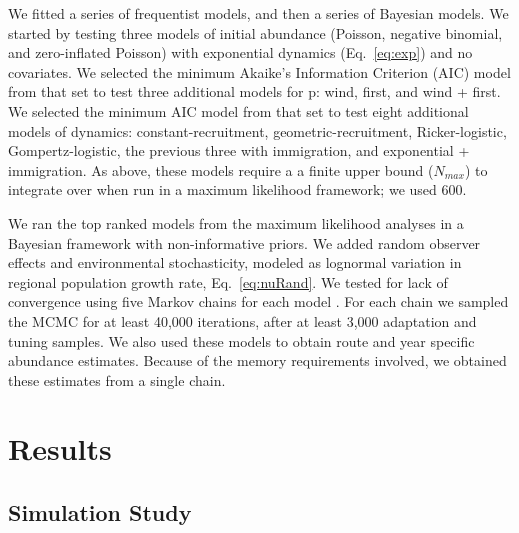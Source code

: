 \documentclass[12pt]{article}
\begin{document}
We fitted a series of frequentist models, 
and then a series of Bayesian models. We started by testing
three models of initial abundance (Poisson, negative binomial, and
zero-inflated Poisson) with exponential dynamics
(Eq.~\ref{eq:exp}) and no covariates.  We selected the minimum Akaike's Information
Criterion (AIC) model from that set to test three additional
models for p: wind, first, and wind + first. We selected the minimum
AIC model from that set to test eight additional models of dynamics:
constant-recruitment, geometric-recruitment, Ricker-logistic, Gompertz-logistic, 
the previous three with immigration, and exponential + immigration.
As above, these models require a a finite upper bound ($N_{max}$) to integrate
over when run in a maximum likelihood
framework; we used 600. %

We ran the top ranked models from the maximum likelihood
analyses in a Bayesian framework with non-informative priors.  We added random observer 
effects and environmental stochasticity, modeled as lognormal
variation in regional population growth rate, Eq.~\ref{eq:nuRand}. %
We tested for lack of convergence using
five Markov chains for each model \citep{gelman_rubin:1992}.
For each chain we sampled the MCMC for at least 40,000 iterations, after at
least 3,000 adaptation and tuning samples.  
We also used these models to obtain route and 
year specific abundance estimates.  Because of the memory requirements involved,
we obtained these estimates from a single chain.  %

\section{Results}

\subsection{Simulation Study}
\end{document}
